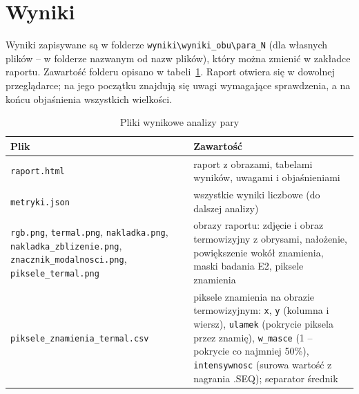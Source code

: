 
\section{Wyniki}

Wyniki zapisywane są w folderze \texttt{wyniki\textbackslash wyniki\_obu\textbackslash para\_N} (dla własnych plików -- w folderze nazwanym od nazw plików), który można zmienić w zakładce raportu. Zawartość folderu opisano w tabeli~\ref{tab:instrukcja-pliki}. Raport otwiera się w dowolnej przeglądarce; na jego początku znajdują się uwagi wymagające sprawdzenia, a na końcu objaśnienia wszystkich wielkości.

\begin{table}[!ht]
  \centering
  \caption{Pliki wynikowe analizy pary}
  \label{tab:instrukcja-pliki}
  \footnotesize
  \begin{tabularx}{\textwidth}{>{\raggedright\arraybackslash}p{4.4cm} X}
    \toprule
    Plik & Zawartość \\
    \midrule
    \texttt{raport.html} & raport z obrazami, tabelami wyników, uwagami i objaśnieniami \\
    \texttt{metryki.json} & wszystkie wyniki liczbowe (do dalszej analizy) \\
    \texttt{rgb.png}, \texttt{termal.png}, \texttt{nakladka.png}, \texttt{nakladka\_zblizenie.png}, \texttt{znacznik\_modalnosci.png}, \texttt{piksele\_termal.png} & obrazy raportu: zdjęcie i obraz termowizyjny z obrysami, nałożenie, powiększenie wokół znamienia, maski badania E2, piksele znamienia \\
    \texttt{piksele\_znamienia\_termal.csv} & piksele znamienia na obrazie termowizyjnym: \texttt{x}, \texttt{y} (kolumna i wiersz), \texttt{ulamek} (pokrycie piksela przez znamię), \texttt{w\_masce} (1 -- pokrycie co najmniej 50\%), \texttt{intensywnosc} (surowa wartość z nagrania .SEQ); separator średnik \\
    \bottomrule
  \end{tabularx}
\end{table}

